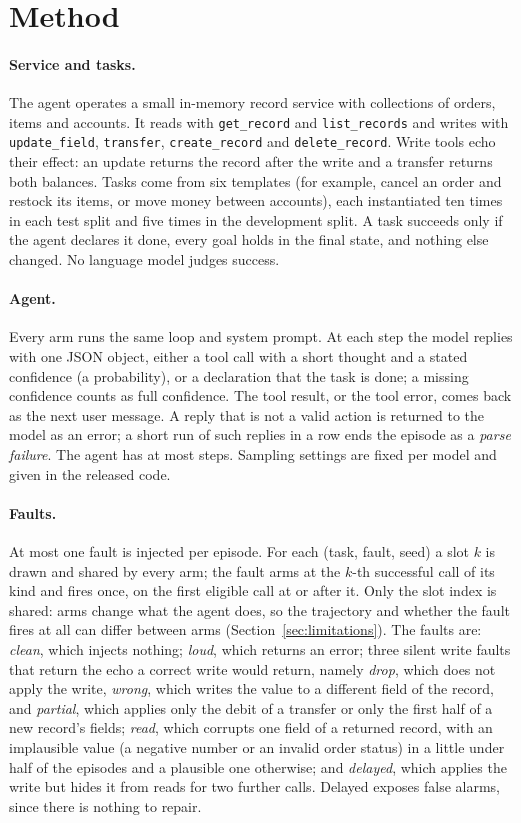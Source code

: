\section{Method}\label{sec:method}
\paragraph{Service and tasks.} The agent operates a small in-memory record service with collections
of orders, items and accounts. It reads with \texttt{get\_record} and \texttt{list\_records} and
writes with \texttt{update\_field}, \texttt{transfer}, \texttt{create\_record} and
\texttt{delete\_record}. Write tools echo their effect: an update returns the record after the write
and a transfer returns both balances. Tasks come from six templates (for example, cancel an order and
restock its items, or move money between accounts), each instantiated ten times in each test split and five times in the development split. A task
succeeds only if the agent declares it done, every goal holds in the final state, and nothing else
changed. No language model judges success.

\paragraph{Agent.} Every arm runs the same loop and system prompt. At each step the model replies with
one JSON object, either a tool call with a short thought and a stated confidence (a probability), or a
declaration that the task is done; a missing confidence counts as full confidence. The tool result, or
the tool error, comes back as the next user message. A reply that is not a valid action is returned to
the model as an error; a short run of such replies in a row ends the episode as a \emph{parse
failure}. The agent has at most \RQwenEightMaxSteps{} steps. Sampling settings are fixed per model and
given in the released code.

\paragraph{Faults.} At most one fault is injected per episode. For each (task, fault, seed) a slot
$k$ is drawn and shared by every arm; the fault arms at the $k$-th successful call of its kind and
fires once, on the first eligible call at or after it. Only the slot index is shared: arms change what the agent does, so the
trajectory and whether the fault fires at all can differ between arms (Section~\ref{sec:limitations}). The faults are:
\emph{clean}, which injects nothing;
\emph{loud}, which returns an error;
three silent write faults that return the echo a correct write would return, namely \emph{drop},
which does not apply the write, \emph{wrong}, which writes the value to a different field of the
record, and \emph{partial}, which applies only the debit of a transfer or only the first half of a
new record's fields;
\emph{read}, which corrupts one field of a returned record, with an implausible value (a negative
number or an invalid order status) in a little under half of the episodes and a plausible one otherwise;
and \emph{delayed}, which applies the write but hides it from reads for two further calls. Delayed
exposes false alarms, since there is nothing to repair.

